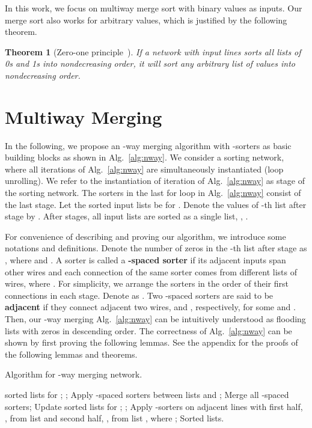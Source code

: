 \documentclass[10pt,journal,cspaper,compsoc]{IEEEtran}
\newtheorem{thm}{Theorem}[section]
\begin{document}
In this work, we focus on multiway merge sort with binary values as inputs. Our merge sort also works for arbitrary values, which is justified by the following theorem.
\begin{thm}[Zero-one principle~\cite{Bat68sorting}]
  If a network with  input lines sorts all  lists of 0s and 1s into nondecreasing order, it will sort any arbitrary list of  values into nondecreasing order.
\end{thm}


\section{Multiway Merging}
\label{sec:kmerge}
In the following, we propose an -way merging algorithm with -sorters as basic building blocks as shown in Alg.~\ref{alg:nway}.
We consider a sorting network, where all iterations of Alg.~\ref{alg:nway} are simultaneously instantiated (loop unrolling). We refer to the instantiation of iteration  of Alg.~\ref{alg:nway} as stage  of the sorting network.
The sorters in the last for loop in Alg.~\ref{alg:nway} consist of the last stage.
Let the  sorted input lists be  for . Denote the values of -th list after stage  by . After  stages, all input lists are sorted as a single list, , .


For convenience of describing and proving our algorithm, we introduce some notations and definitions. Denote the number of zeros in the -th list after stage  as , where  and . A sorter is called a \textbf{-spaced sorter} if its adjacent inputs span  other wires and each connection of the same sorter comes from different lists of  wires, where . For simplicity, we arrange the sorters in the order of their first connections in each stage. Denote  as . Two -spaced sorters are said to be \textbf{adjacent} if they connect adjacent two wires,  and , respectively, for some  and .
Then, our -way merging Alg.~\ref{alg:nway} can be intuitively understood as flooding lists with zeros in descending order. The correctness of Alg.~\ref{alg:nway} can be shown by first proving the following lemmas. See the appendix for the proofs of the following lemmas and theorems.


\begin{algorithm}[!tp]
  \caption{Algorithm for -way merging network.}
  \begin{algorithmic}
    \REQUIRE  sorted lists  for ;
    \STATE ;
    \WHILE{}
            \STATE Apply -spaced sorters between lists  and ;
        \ENDFOR
        \STATE Merge all -spaced sorters;
        \STATE Update  sorted lists  for ;
        \STATE ;
    \ENDWHILE
        \STATE Apply -sorters on  adjacent lines with first half, , from list  and second half, , from list , where ;
    \ENDFOR
\RETURN Sorted lists.
  \end{algorithmic}
  \label{alg:nway}
\end{algorithm}
\end{document}
